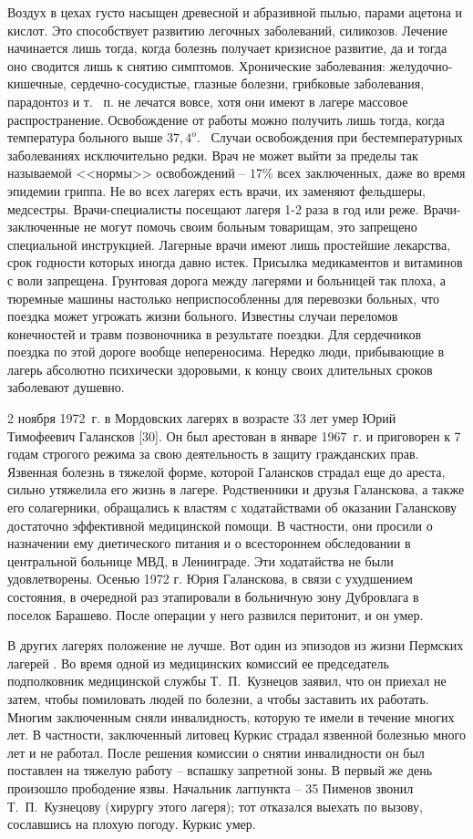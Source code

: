 \documentclass{book}
\begin{document}
Воздух в цехах густо насыщен древесной и абразивной пылью, парами ацетона и кислот. Это способствует развитию легочных заболеваний, силикозов. Лечение начинается лишь тогда, когда болезнь получает кризисное развитие, да и тогда оно сводится лишь к снятию симптомов. Хронические заболевания: желудочно-кишечные, сердечно-сосудистые, глазные болезни, грибковые заболевания, парадонтоз и т.~ п. не лечатся вовсе, хотя они имеют в лагере массовое распространение. Освобождение от работы можно получить лишь тогда, когда температура больного выше $37,4^{o}$.  Случаи освобождения при бестемпературных заболеваниях исключительно редки. Врач не может выйти за пределы так называемой <<нормы>> освобождений -- $17\%$ всех заключенных, даже во время эпидемии гриппа. Не во всех лагерях есть врачи, их заменяют фельдшеры, медсестры. Врачи-специалисты посещают лагеря 1-2 раза в год или реже. Врачи-заключенные не могут помочь своим больным товарищам, это запрещено специальной инструкцией. Лагерные врачи имеют лишь простейшие 
лекарства, срок годности кото­рых иногда давно истек. Присылка медикаментов и витаминов с воли запрещена.
Грунтовая дорога между лагерями и больницей так плоха, а тюремные машины настолько неприспособленны для перевозки больных, что поездка может угрожать жизни больного. Известны случаи переломов конечностей и травм позвоночника в результате поездки. Для сердечников поездка по этой дороге вообще непереносима. Нередко люди, прибывающие в лагерь абсолютно психически здоровыми, к концу своих длительных сроков заболевают душевно.

2 ноября 1972~г. в Мордовских лагерях в возрасте 33 лет умер Юрий Тимофеевич Галансков [30]. Он был арестован в январе 1967~г. и приговорен к 7 годам строгого режима за свою деятельность в защиту гражданских прав. Язвенная болезнь в тяжелой форме, которой Галансков страдал еще до ареста, сильно утяжелила его жизнь в лагере. Родственники и друзья Галанскова, а также его солагерники, обращались к властям с ходатайствами об оказании Галанскову достаточно эффективной медицинской помощи. В частности, они просили о назначении ему диетического питания и о всестороннем обследова­нии в центральной больнице МВД, в Ленинграде. Эти ходатайства не были удовлетворены. Осенью 1972 г. Юрия Галанскова, в связи с ухудшением состояния, в очередной раз этапировали в больничную зону Дубровлага в поселок Барашево. После операции у него развился перитонит, и он умер.

В других лагерях положение не лучше. Вот один из эпизодов из жизни Пермских лагерей . Во время одной из медицинских комиссий ее председатель подполковник медицинской службы Т.~П.~Кузнецов заявил, что он приехал не затем, чтобы помиловать людей по болезни, а чтобы заставить их работать. Многим заключенным сняли инвалидность, которую те имели в течение многих лет. В частности, заключенный литовец Куркис страдал язвенной болезнью много лет и не работал. После решения комиссии о снятии инвалидности он был поставлен на тяжелую работу -- вспашку запретной зоны. В первый же день произошло прободение язвы. Начальник лагпункта -- 35 Пименов звонил Т.~П.~Кузнецову (хирургу этого лагеря); тот отказался выехать по вызову, сославшись на плохую погоду. Куркис умер.
\end{document}
